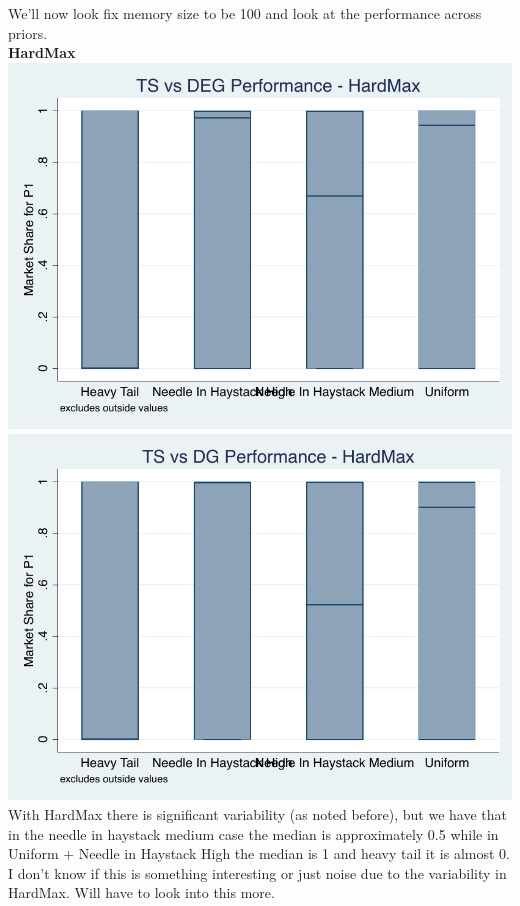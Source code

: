 \documentclass[11pt,letterpaper]{article}
\begin{document}
\pagebreak
We'll now look fix memory size to be 100 and look at the performance across priors.\\
\textbf{HardMax} \\
\includegraphics[scale=0.9]{hm_ts_deg_prior} \\
\includegraphics[scale=0.9]{hm_ts_dg_prior} \\
With HardMax there is significant variability (as noted before), but we have that in the needle in haystack medium case the median is approximately 0.5 while in Uniform + Needle in Haystack High the median is 1 and heavy tail it is almost 0. I don't know if this is something interesting or just noise due to the variability in HardMax. Will have to look into this more.
\end{document}
